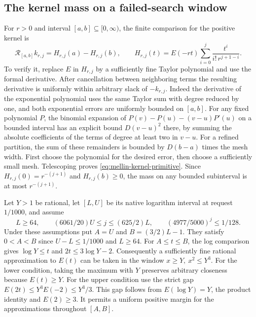 \documentclass[11pt]{amsart}
\theoremstyle{definition}
\theoremstyle{remark}
\numberwithin{equation}{section}
\begin{document}
\subsection{The kernel mass on a failed-search window}
\label{sec:mellin-window-bound}

For \(r>0\) and interval \([a,b]\subseteq[0,\infty)\),
the finite comparison for the positive kernel is
\begin{equation}\label{eq:mellin-kernel-primitive}
 \mathcal R_{[a,b]} k_{r,j}=H_{r,j}(a)-H_{r,j}(b),\qquad
 H_{r,j}(t)=E(-rt)\sum_{i=0}^j\frac{t^i}{i!\,r^{j+1-i}} .
\end{equation}
To verify it, replace \(E\) in \(H_{r,j}\) by a sufficiently
fine Taylor polynomial and use the formal derivative.
After cancellation between neighboring terms the resulting derivative
is uniformly within arbitrary slack of \(-k_{r,j}\).
Indeed the derivative of the exponential polynomial uses the
same Taylor sum with degree reduced by one, and both exponential
errors are uniformly bounded on \([a,b]\).
For any fixed polynomial \(P\), the binomial expansion of
\(P(v)-P(u)-(v-u)P'(u)\) on a bounded interval has an explicit
bound \(D(v-u)^2\) there, by summing the absolute coefficients
of the terms of degree at least two in \(v-u\).
For a refined partition, the sum of these remainders is bounded
by \(D(b-a)\) times the mesh width. First choose the polynomial
for the desired error, then choose a sufficiently small mesh.
Telescoping proves \eqref{eq:mellin-kernel-primitive}.
Since \(H_{r,j}(0)=r^{-(j+1)}\) and \(H_{r,j}(b)\ge0\), the
mass on any bounded subinterval is at most \(r^{-(j+1)}\).

Let \(Y>1\) be rational, let \([L,U]\) be its native
logarithm interval at request \(1/1000\), and assume
\[
     L\ge64,\qquad (6061/20)U\le j\le(625/2)L,\qquad
                      (4977/5000)^j\le1/128.
\]
Under these assumptions put \(A=U\) and \(B=(3/2)L-1\).
They satisfy \(0<A<B\) since \(U-L\le1/1000\)
and \(L\ge64\).
For \(A\le t\le B\), the log comparison gives
\(\log Y\le t\) and \(2t\le3\log Y-2\).
Consequently a sufficiently fine rational approximation to \(E(t)\)
can be taken in the window \(x\ge Y,\ x^2\le Y^3\).
For the lower condition, taking the maximum with \(Y\) preserves
arbitrary closeness because \(E(t)\ge Y\).
For the upper condition use the strict gap
\(E(2t)\le Y^3 E(-2)\le Y^3/3\).
This gap follows from \(E(\log Y)=Y\), the product identity and
\(E(2)\ge3\). It permits a uniform positive margin for the
approximations throughout \([A,B]\).
\end{document}
